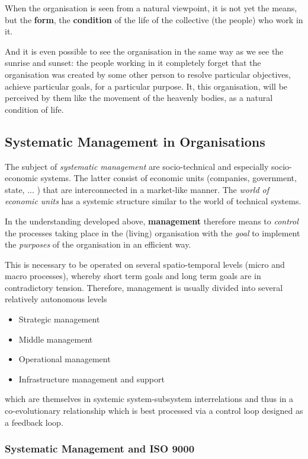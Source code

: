 \documentclass[11pt,a4paper]{article}
\begin{document}
When the organisation is seen from a natural viewpoint, it is not yet the
means, but the \textbf{form}, the \textbf{condition} of the life of the
collective (the people) who work in it.

And it is even possible to see the organisation in the same way as we see the
sunrise and sunset: the people working in it completely forget that the
organisation was created by some other person to resolve particular
objectives, achieve particular goals, for a particular purpose. It, this
organisation, will be perceived by them like the movement of the heavenly
bodies, as a natural condition of life.

\subsection{Systematic Management in Organisations}

The subject of \emph{systematic management} are socio-technical and especially
socio-economic systems. The latter consist of economic units (companies,
government, state, ... ) that are interconnected in a market-like manner. The
\emph{world of economic units} has a systemic structure similar to the world
of technical systems.

In the understanding developed above, \textbf{management} therefore means to
\emph{control} the processes taking place in the (living) organisation with
the \emph{goal} to implement the \emph{purposes} of the organisation in an
efficient way.

This is necessary to be operated on several spatio-temporal levels (micro and
macro processes), whereby short term goals and long term goals are in 
contradictory tension. Therefore, management is usually divided into several
relatively autonomous levels
\begin{itemize}
\item Strategic management
\item Middle management
\item Operational management
\item Infrastructure management and support
\end{itemize}
which are themselves in systemic system-subsystem interrelations and thus in a
co-evolutio\-nary relationship which is best processed via a control loop
designed as a feedback loop.

\subsubsection*{Systematic Management and ISO 9000}
\end{document}
